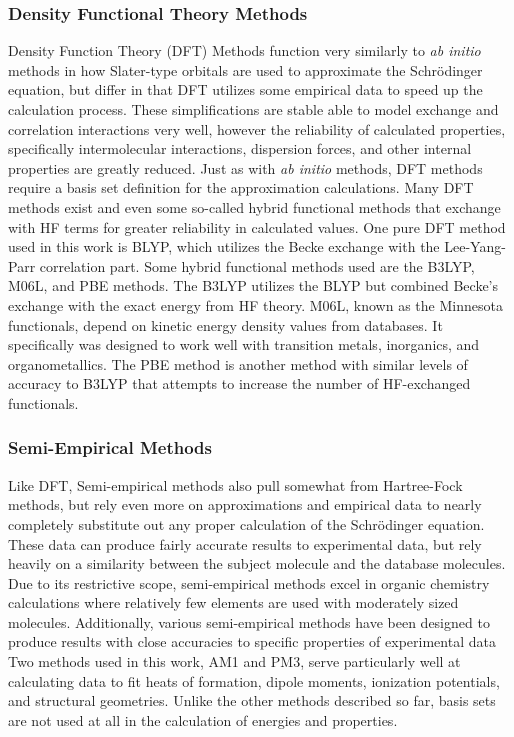 \subsubsection{Density Functional Theory Methods}

Density Function Theory (DFT) Methods function very similarly to \textit{ab initio} methods in how Slater-type orbitals are used to approximate the Schrödinger equation, but differ in that DFT utilizes some empirical data to speed up the calculation process.\cite{DFT}
These simplifications are stable able to model exchange and correlation interactions very well, however the reliability of calculated properties, specifically intermolecular interactions, dispersion forces, and other internal properties are greatly reduced.
Just as with \textit{ab initio} methods, DFT methods require a basis set definition for the approximation calculations.
Many DFT methods exist and even some so-called hybrid functional methods that exchange with HF terms for greater reliability in calculated values.
One pure DFT method used in this work is BLYP, which utilizes  the Becke exchange with the Lee-Yang-Parr correlation part.
Some hybrid functional methods used are the B3LYP, M06L, and PBE methods.
The B3LYP utilizes the BLYP but combined Becke's exchange with the exact energy from HF theory.
M06L, known as the Minnesota functionals, depend on kinetic energy density values from databases.
It specifically was designed to work well with transition metals, inorganics, and organometallics.\cite{M06L}
The PBE method is another method with similar levels of accuracy to B3LYP that attempts to increase the number of HF-exchanged functionals.\cite{PBE}

\subsubsection{Semi-Empirical Methods}

Like DFT, Semi-empirical methods also pull somewhat from Hartree-Fock methods, but rely even more on approximations and empirical data to nearly completely substitute out any proper calculation of the Schrödinger equation.
These data can produce fairly accurate results to experimental data, but rely heavily on a similarity between the subject molecule and the database molecules.
Due to its restrictive scope, semi-empirical methods excel in organic chemistry calculations where relatively few elements are used with moderately sized molecules.\cite{huckel}
Additionally, various semi-empirical methods have been designed to produce results with close accuracies to specific properties of experimental data 
Two methods used in this work, AM1\cite{AM1} and PM3,\cite{PM3} serve particularly well at calculating data to fit heats of formation, dipole moments, ionization potentials, and structural geometries.
Unlike the other methods described so far, basis sets are not used at all in the calculation of energies and properties.

